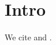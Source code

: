 \documentclass{article}
\begin{document}
\section{Intro}\label{sec:intro}
We cite \cite{refA} and \cite{nosuchkey}.


\end{document}
